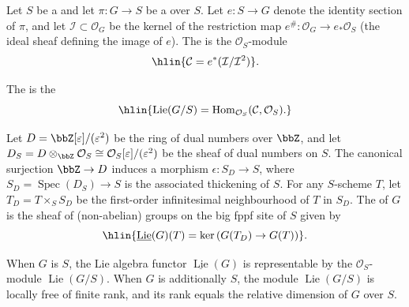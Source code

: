 \begin{definition} \label{definition:lie_algebra_of_a_group_scheme_over_a_base_scheme}
Let $S$ be a  and let $\pi: G \to S$ be a  over $S$. Let $e: S \to G$ denote the identity section of $\pi$, and let $\mathcal{I} \subset \mathcal{O}_G$ be the kernel of the restriction map $e^\#: \mathcal{O}_G \to e_*\mathcal{O}_S$ (the ideal sheaf defining the image of $e$). The  is the $\mathcal{O}_S$-module
$$\hlin{\mathcal{C} = e^*(\mathcal{I}/\mathcal{I}^2)}.$$

The  is the 
$$\hlin{\operatorname{Lie}(G/S) = \operatorname{Hom}_{\mathcal{O}_S}(\mathcal{C}, \mathcal{O}_S).}$$

Let $D = \bbZ[\varepsilon]/(\varepsilon^2)$ be the ring of dual numbers over $\bbZ$, and let $D_S = D \otimes_\bbZ \mathcal{O}_S \cong \mathcal{O}_S[\varepsilon]/(\varepsilon^2)$ be the sheaf of dual numbers on $S$. The canonical surjection $\bbZ \to D$ induces a morphism $\epsilon: S_D \to S$, where $S_D = \operatorname{Spec}(D_S) \to S$ is the associated thickening of $S$. For any $S$-scheme $T$, let $T_D = T \times_S S_D$ be the first-order infinitesimal neighbourhood of $T$ in $S_D$. The  of $G$ is the sheaf of (non-abelian) groups on the big fppf site of $S$ given by
$$\hlin{\underline{\operatorname{Lie}}(G)(T) = \ker\left(G(T_D) \to G(T)\right)}.$$

When $G$ is  $S$, the Lie algebra functor $\underline{\operatorname{Lie}}(G)$ is representable by the $\mathcal{O}_S$-module $\operatorname{Lie}(G/S)$. When $G$ is additionally  $S$, the module $\operatorname{Lie}(G/S)$ is locally free of finite rank, and its rank equals the relative dimension of $G$ over $S$.
\end{definition}
